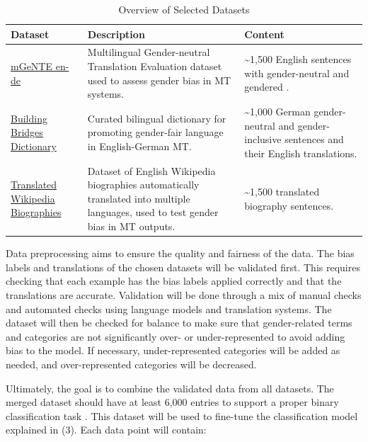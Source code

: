 \documentclass[oneside, paper=A4, DIV=15]{scrartcl}
\begin{document}
\begin{description}
\begin{table}[h!]
    \centering
    \renewcommand{\arraystretch}{1.3}
    \begin{tabularx}{\textwidth}{|X|X|X|}
    \hline
    \textbf{Dataset} & \textbf{Description} & \textbf{Content} \\ \hline
    \href{https://huggingface.co/datasets/FBK-MT/mGeNTE}{mGeNTE en-de} \parencite{savoldi_mgente_2025} & Multilingual Gender-neutral Translation Evaluation dataset used to assess gender bias in MT systems. & \textasciitilde1,500 English sentences with gender-neutral and gendered . \\ \hline
    \href{https://github.com/g8a9/building-bridges-gender-fair-german-mt}{Building Bridges Dictionary} \parencite{lardelli_building_2024} & Curated bilingual dictionary for promoting gender-fair language in English-German MT. & \textasciitilde1,000 German gender-neutral and gender-inclusive sentences and their English translations.  \\ \hline
    \href{https://research.google/blog/a-dataset-for-studying-gender-bias-in-translation/}{Translated Wikipedia Biographies} \parencite{stella_dataset_2021} & Dataset of English Wikipedia biographies automatically translated into multiple languages, used to test gender bias in MT outputs. & \textasciitilde1,500 translated biography sentences. \\ \hline
    \end{tabularx}
    \caption{Overview of Selected Datasets}
    \label{tab:datasets}
\end{table}

Data preprocessing aims to ensure the quality and fairness of the data.
The bias labels and translations of the chosen datasets will be validated first. This requires checking that each example has the bias labels applied correctly and that the translations are accurate. Validation will be done through a mix of manual checks and automated checks using language models and translation systems. The dataset will then be checked for balance to make sure that gender-related terms and categories are not significantly over- or under-represented to avoid adding bias to the model. If necessary, under-represented categories will be added as needed, and over-represented categories will be decreased.

Ultimately, the goal is to combine the validated data from all datasets. The merged dataset should have at least 6,000 entries to support a proper binary classification task \parencite{pecher_comparing_2024}. This dataset will be used to fine-tune the classification model explained in (3). Each data point will contain:


\end{description}
\end{document}
